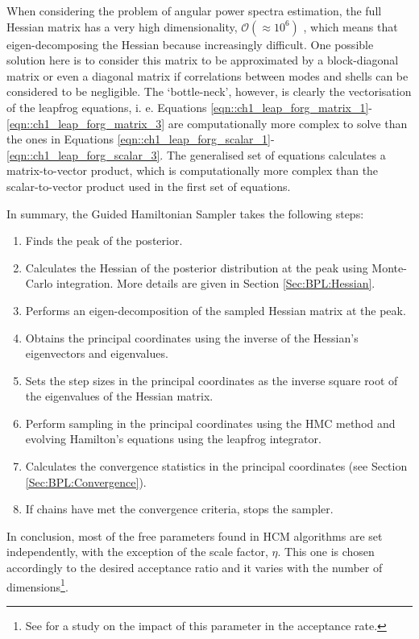 \qquad When considering the problem of angular power spectra estimation, the full Hessian matrix has a very high dimensionality, $\mathcal{O} (\approx 10^6)$ , which means that eigen-decomposing the Hessian because increasingly difficult. One possible solution here is to consider this matrix to be approximated by a block-diagonal matrix or even a diagonal matrix if correlations between modes and shells can be considered to be negligible. The `bottle-neck', however, is clearly the vectorisation of the leapfrog equations, i. e. Equations \eqref{eqn::ch1_leap_forg_matrix_1}-\eqref{eqn::ch1_leap_forg_matrix_3} are computationally more complex to solve than the ones in Equations \eqref{eqn::ch1_leap_forg_scalar_1}-\eqref{eqn::ch1_leap_forg_scalar_3}. The generalised set of equations calculates a matrix-to-vector product, which is computationally more complex than the scalar-to-vector product used in the first set of equations.

\qquad In summary, the Guided Hamiltonian Sampler takes the following steps:
\begin{enumerate}
\item Finds the peak of the posterior.
\item Calculates the Hessian of the posterior distribution at the peak using Monte-Carlo integration. More details are given in Section \ref{Sec:BPL:Hessian}.
\item Performs an eigen-decomposition of the sampled Hessian matrix at the peak.
\item Obtains the principal coordinates using the inverse of the Hessian's eigenvectors and eigenvalues.
\item Sets the step sizes in the principal coordinates as the inverse square root of the eigenvalues of the Hessian matrix.
\item Perform sampling in the principal coordinates using the HMC method and evolving Hamilton's equations using the leapfrog integrator.
\item Calculates the convergence statistics in the principal coordinates (see Section \ref{Sec:BPL:Convergence}).
\item If chains have met the convergence criteria, stops the sampler.
\end{enumerate}

In conclusion, most of the free parameters found in HCM algorithms are set independently, with the exception of the scale factor, $\eta$. This one is chosen accordingly to the desired acceptance ratio and it varies with the number of dimensions\footnote{See \citealt{SreeThesis} for a study on the impact of this parameter in the acceptance rate.}.

